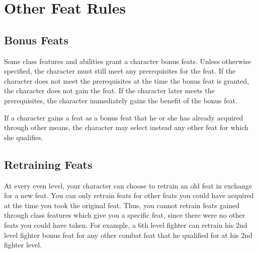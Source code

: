 \section{Other Feat Rules}

\subsection{Bonus Feats}
Some class features and abilities grant a character bonus feats.
Unless otherwise specified, the character must still meet any prerequisites for the feat.
If the character does not meet the prerequisites at the time the bonus feat is granted, the character does not gain the feat.
If the character later meets the prerequisites, the character immediately gains the benefit of the bonus feat.

If a character gains a feat as a bonus feat that he or she has already acquired through other means, the character may select instead any other feat for which she qualifies.

\subsection{Retraining Feats}
At every even level, your character can choose to retrain an old feat in exchange for a new feat.
You can only retrain feats for other feats you could have acquired at the time you took the original feat.
Thus, you cannot retrain feats gained through class features which give you a specific feat, since there were no other feats you could have taken.
For example, a 6th level fighter can retrain his 2nd level fighter bonus feat for any other combat feat that he qualified for at his 2nd fighter level.
